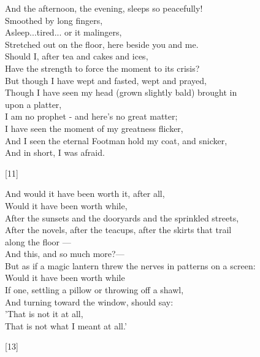 \documentclass{article}
\begin{document}
\begin{multicols}{2}

\begin{minipage}{10cm}
    \onehalfspacing
    And the afternoon, the evening, sleeps so peacefully!\\
    Smoothed by long fingers,\\
    Asleep...tired... or it malingers,\\
    Stretched out on the floor, here beside you and me.\\
    Should I, after tea and cakes and ices,\\
    Have the strength to force the moment to its crisis?\\
    But though I have wept and fasted, wept and prayed,\\
    Though I have seen my head (grown slightly bald) brought in\\
    \quad{}upon a platter,\\
    I am no prophet - and here's no great matter;\\
    I have seen the moment of my greatness flicker,\\
    And I seen the eternal Footman hold my coat, and snicker,\\
    And in short, I was afraid.
    \begin{center}[11]\end{center}

\smallskip
\begin{minipage}{10cm}
    And would it have been worth it, after all,\\
    Would it have been worth while,\\
    After the sunsets and the dooryards and the sprinkled streets,\\
    After the novels, after the teacups, after the skirts that trail\\
    \quad{}along the floor ---\\
    And this, and so much more?---\\
    But as if a magic lantern threw the nerves in patterns on a screen:\\
    Would it have been worth while\\
    If one, settling a pillow or throwing off a shawl,\\
    And turning toward the window, should say:\\
    \quad{}'That is not it at all,\\
    \quad{}That is not what I meant at all.'
    \begin{center}[13]\end{center}
\end{minipage}
\end{minipage}



\end{multicols}
\end{document}
